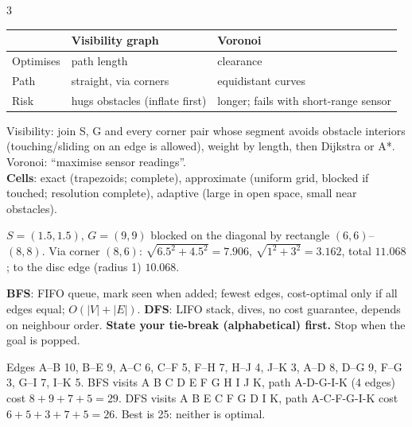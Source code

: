 \begin{multicols}{3}
\begin{tabularx}{\linewidth}{@{}lXX@{}}\toprule
 & Visibility graph & Voronoi\\\midrule
Optimises & path length & clearance\\
Path & straight, via corners & equidistant curves\\
Risk & hugs obstacles (inflate first) & longer; fails with short-range sensor\\\bottomrule
\end{tabularx}
Visibility: join S, G and every corner pair whose segment avoids obstacle interiors (touching/sliding on an edge is allowed), weight by length, then Dijkstra or A*. Voronoi: ``maximise sensor readings''.\\
\textbf{Cells}: exact (trapezoids; complete), approximate (uniform grid, blocked if touched; resolution complete), adaptive (large in open space, small near obstacles).
\begin{worked}
$S=(1.5,1.5)$, $G=(9,9)$ blocked on the diagonal by rectangle $(6,6)$--$(8,8)$. Via corner $(8,6)$: $\sqrt{6.5^2+4.5^2}=7.906$, $\sqrt{1^2+3^2}=3.162$, total $11.068$; to the disc edge (radius 1) $10.068$. \chk
\end{worked}

\textbf{BFS}: FIFO queue, mark seen when added; fewest edges, cost-optimal only if all edges equal; $O(|V|+|E|)$. \textbf{DFS}: LIFO stack, dives, no cost guarantee, depends on neighbour order. \textbf{State your tie-break (alphabetical) first.} Stop when the goal is popped.
\begin{worked}
Edges A--B 10, B--E 9, A--C 6, C--F 5, F--H 7, H--J 4, J--K 3, A--D 8, D--G 9, F--G 3, G--I 7, I--K 5. BFS visits A B C D E F G H I J K, path A-D-G-I-K (4 edges) cost $8+9+7+5=29$. DFS visits A B E C F G D I K, path A-C-F-G-I-K cost $6+5+3+7+5=26$. Best is 25: neither is optimal. \chk
\end{worked}


\end{multicols}

